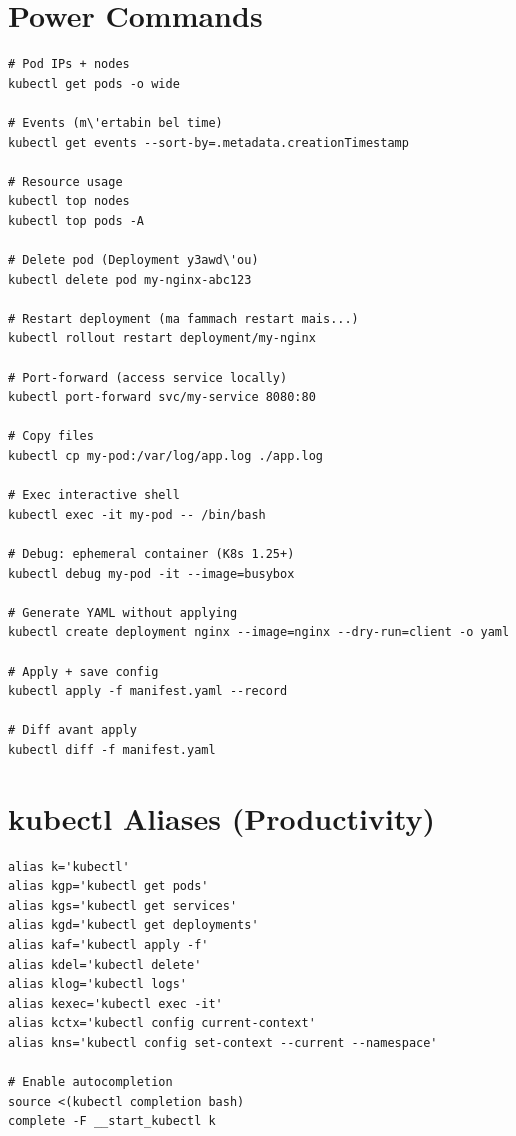 \documentclass[11pt,a4paper]{book}
\begin{document}
\section{Power Commands}

\begin{lstlisting}[caption={Commands kol DevOps lezmou y\'3rafhom}]
# Pod IPs + nodes
kubectl get pods -o wide

# Events (m\'ertabin bel time)
kubectl get events --sort-by=.metadata.creationTimestamp

# Resource usage
kubectl top nodes
kubectl top pods -A

# Delete pod (Deployment y3awd\'ou)
kubectl delete pod my-nginx-abc123

# Restart deployment (ma fammach restart mais...)
kubectl rollout restart deployment/my-nginx

# Port-forward (access service locally)
kubectl port-forward svc/my-service 8080:80

# Copy files
kubectl cp my-pod:/var/log/app.log ./app.log

# Exec interactive shell
kubectl exec -it my-pod -- /bin/bash

# Debug: ephemeral container (K8s 1.25+)
kubectl debug my-pod -it --image=busybox

# Generate YAML without applying
kubectl create deployment nginx --image=nginx --dry-run=client -o yaml

# Apply + save config
kubectl apply -f manifest.yaml --record

# Diff avant apply
kubectl diff -f manifest.yaml
\end{lstlisting}

\section{kubectl Aliases (Productivity)}

\begin{lstlisting}[caption={Zid fi .bashrc / .zshrc}]
alias k='kubectl'
alias kgp='kubectl get pods'
alias kgs='kubectl get services'
alias kgd='kubectl get deployments'
alias kaf='kubectl apply -f'
alias kdel='kubectl delete'
alias klog='kubectl logs'
alias kexec='kubectl exec -it'
alias kctx='kubectl config current-context'
alias kns='kubectl config set-context --current --namespace'

# Enable autocompletion
source <(kubectl completion bash)
complete -F __start_kubectl k
\end{lstlisting}
\end{document}
